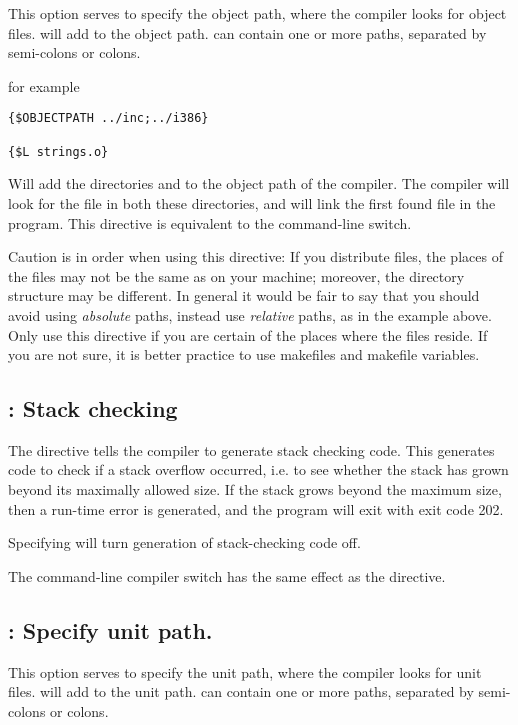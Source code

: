 \documentclass{report}
\begin{document}
This option serves to specify the object path, where the compiler looks for
object files.  will add  to the object
path.  can contain one or more paths, separated by semi-colons or
colons.

for example
\begin{verbatim}
{$OBJECTPATH ../inc;../i386}

{$L strings.o}
\end{verbatim}

Will add the directories  and  to the 
object path of the compiler. The compiler will look for the file 
in both these directories, and will link the first found file in the
program. This directive is equivalent to the  command-line switch.

Caution is in order when using this directive: If you distribute files, the 
places of the files may not be the same as on your machine; moreover, the
directory structure may be different. In general it would be fair to say
that you should avoid using {\em absolute} paths, instead use {\em relative}
paths, as in the example above. Only use this directive if you are certain
of the places where the files reside. If you are not sure, it is better
practice to use makefiles and makefile variables.
 
\subsection{ : Stack checking}
The  directive tells the compiler to generate stack checking
code. This generates code to check if a stack overflow occurred, i.e. to see
whether the stack has grown beyond its maximally allowed size. If the stack
grows beyond the maximum size, then a run-time error is generated, and the
program will exit with exit code 202.

Specifying  will turn generation of stack-checking code off.

The command-line compiler switch  has the same effect as the
 directive.

\subsection{ : Specify unit path.}

This option serves to specify the unit path, where the compiler looks for
unit files.  will add  to the unit
path.  can contain one or more paths, separated by semi-colons or
colons.
\end{document}
